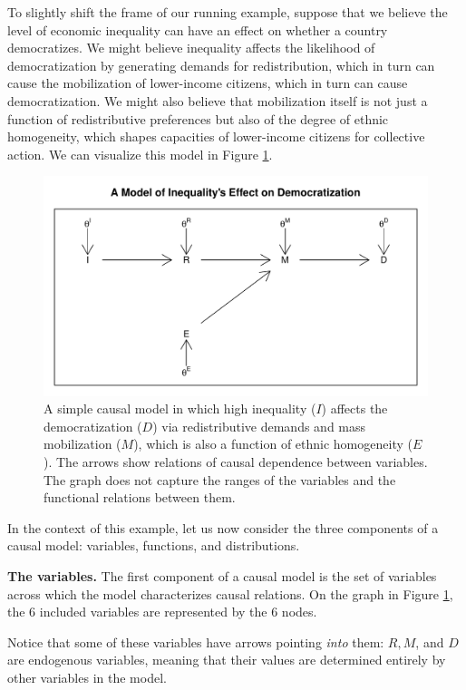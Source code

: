 \documentclass[12pt,]{book}
\begin{document}
To slightly shift the frame of our running example, suppose that we believe the level of economic inequality can have an effect on whether a country democratizes. We might believe inequality affects the likelihood of democratization by generating demands for redistribution, which in turn can cause the mobilization of lower-income citizens, which in turn can cause democratization. We might also believe that mobilization itself is not just a function of redistributive preferences but also of the degree of ethnic homogeneity, which shapes capacities of lower-income citizens for collective action. We can visualize this model in Figure \ref{fig:simpleDAG}.

\begin{figure}

{\centering \includegraphics[width=.5\textwidth]{ii_files/figure-latex/simpleDAG-1} 

}

\caption{A simple causal model in which high inequality ($I$) affects the democratization ($D$) via redistributive demands and mass mobilization ($M$), which is also a function of ethnic homogeneity ($E$). The arrows show relations of causal dependence between variables.  The graph does not capture the ranges of the variables and the functional relations between them.}\label{fig:simpleDAG}
\end{figure}

In the context of this example, let us now consider the three components of a causal model: variables, functions, and distributions.

\textbf{The variables.} The first component of a causal model is the set of variables across which the model characterizes causal relations. On the graph in Figure \ref{fig:simpleDAG}, the 6 included variables are represented by the 6 nodes.

Notice that some of these variables have arrows pointing \emph{into} them: \(R, M\), and \(D\) are endogenous variables, meaning that their values are determined entirely by other variables in the model.
\end{document}
